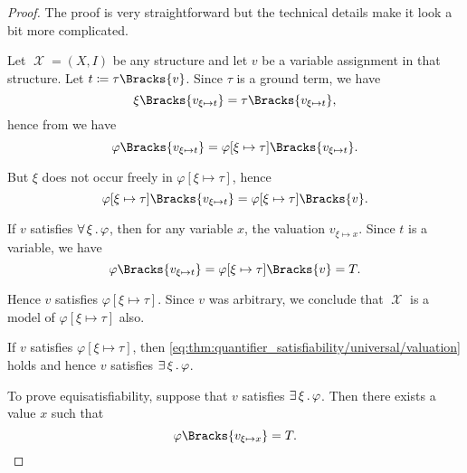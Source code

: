 \begin{proof}
  The proof is very straightforward but the technical details make it look a bit more complicated.

  Let \( \mscrX = (X, I) \) be any structure and let \( v \) be a variable assignment in that structure. Let \( t \coloneqq \tau\Bracks{v} \). Since \( \tau \) is a ground term, we have
  \begin{equation*}
    \xi\Bracks{v_{\xi \mapsto t}} = \tau\Bracks{v_{\xi \mapsto t}},
  \end{equation*}
  hence from  we have
  \begin{equation*}
    \varphi\Bracks{v_{\xi \mapsto t}}
    =
    \varphi[\xi \mapsto \tau]\Bracks{v_{\xi \mapsto t}}.
  \end{equation*}

  But \( \xi \) does not occur freely in \( \varphi[\xi \mapsto \tau] \), hence
  \begin{equation*}
    \varphi[\xi \mapsto \tau]\Bracks{v_{\xi \mapsto t}}
    =
    \varphi[\xi \mapsto \tau]\Bracks{v}.
  \end{equation*}

   If \( v \) satisfies \( \forall \thinspace \xi \thinspace . \thinspace \varphi \), then for any variable \( x \), the valuation \( v_{\xi \mapsto x} \). Since \( t \) is a variable, we have
  \begin{equation}\label{eq:thm:quantifier_satisfiability/universal/valuation}
    \varphi\Bracks{v_{\xi \mapsto t}}
    =
    \varphi[\xi \mapsto \tau]\Bracks{v}
    =
    T.
  \end{equation}

  Hence \( v \) satisfies \( \varphi[\xi \mapsto \tau] \). Since \( v \) was arbitrary, we conclude that \( \mscrX \) is a model of \( \varphi[\xi \mapsto \tau] \) also.

   If \( v \) satisfies \( \varphi[\xi \mapsto \tau] \), then \eqref{eq:thm:quantifier_satisfiability/universal/valuation} holds and hence \( v \) satisfies \( \exists \thinspace \xi \thinspace . \thinspace \varphi \).

  To prove equisatisfiability, suppose that \( v \) satisfies \( \exists \thinspace \xi \thinspace . \thinspace \varphi \). Then there exists a value \( x \) such that
  \begin{equation}\label{eq:thm:quantifier_satisfiability/existential/existence_modified_assignment}
    \varphi\Bracks{v_{\xi \mapsto x}} = T.
  \end{equation}


\end{proof}
